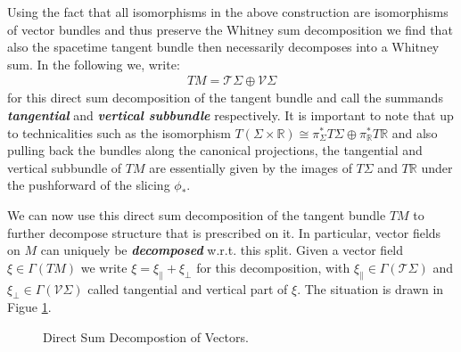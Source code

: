 Using the fact that all isomorphisms in the above construction are isomorphisms of vector bundles and thus preserve the Whitney sum decomposition we find that also the spacetime tangent bundle then necessarily decomposes into a Whitney sum. In the following we, write:
\begin{align}
    TM = \mathcal{T}\Sigma \oplus \mathcal{V}\Sigma
\end{align} 
for this direct sum decomposition of the tangent bundle and call the summands \textit{\textbf{tangential}} and \textit{\textbf{vertical subbundle}} respectively.  
It is important to note that up to technicalities such as the isomorphism $T(\Sigma \times \mathbb{R}) \cong \pi_{\Sigma}^{\ast}T\Sigma \oplus \pi_{\mathbb{R}}^{\ast} T\mathbb{R}$ and also pulling back the bundles along the canonical projections, the tangential and vertical subbundle of $TM$ are essentially given by the images of $T\Sigma$ and $T\mathbb{R}$ under the pushforward of the slicing $\phi_{\ast}$. 

We can now use this direct sum decomposition of the tangent bundle $TM$ to further decompose structure that is prescribed on it.
In particular, vector fields on $M$ can uniquely be \textit{\textbf{decomposed}} w.r.t. this split. Given a vector field $\xi \in \Gamma(TM)$ we write $\xi = \xi_{\parallel} + \xi_{\perp} $ for this decomposition, with $\xi_{\parallel} \in \Gamma(\mathcal{T}\Sigma)$ and $\xi_{\perp} \in \Gamma(\mathcal{V}\Sigma)$ called tangential and vertical part of $\xi$. The situation is drawn in Figue \ref{DecompPic}.

\begin{figure}[hbt!]
\centering
{}
\caption{Direct Sum Decompostion of Vectors.}\label{DecompPic}
\end{figure}

